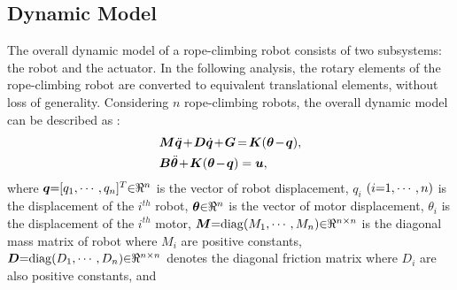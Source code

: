 \documentclass[letterpaper, 10 pt, conference]{ieeeconf}
\begin{document}
\subsection{Dynamic Model}
The overall dynamic model of a rope-climbing robot consists of two subsystems: the robot and the actuator.
In the following analysis, the rotary elements of the rope-climbing robot are converted to equivalent translational elements,
without loss of generality. Considering $n$ rope-climbing robots,
the overall dynamic model can be
described as \cite{ram15_petit}:
\begin{eqnarray}
&\bm M\ddot{{\bm q}}\hspace{-0.05cm}+\hspace{-0.05cm}\bm
D \dot{\bm q}\hspace{-0.05cm}+\hspace{-0.05cm}\bm
G\hspace{-0.05cm}=\hspace{-0.05cm}\bm K(\bm
\theta\hspace{-0.05cm}-\hspace{-0.05cm}\bm
q),\label{grobotDyn}\\
&\bm B\ddot{\bm \theta}\hspace{-0.05cm}+\hspace{-0.05cm}\bm K(\bm
\theta\hspace{-0.05cm}-\hspace{-0.05cm}\bm q)=\bm
u,\label{gactuatorDyn}
\end{eqnarray}
where $\bm q\hspace{-0.1cm}=\hspace{-0.1cm}[q_1, \cdots, q_n]^T\hspace{-0.1cm}\in\hspace{-0.1cm}\Re^n$ is the vector of
robot displacement, $q_i$ $(i\hspace{-0.1cm}=\hspace{-0.1cm}1, \cdots, n)$ is the displacement of the $i^{th}$ robot, $\bm
\theta\hspace{-0.1cm}\in\hspace{-0.1cm}\Re^n$ is the vector of motor displacement, $\theta_i$ is the displacement of the $i^{th}$ motor, $\bm M\hspace{-0.1cm}=\hspace{-0.1cm}{\rm diag}(M_1, \cdots, M_n)\hspace{-0.1cm}\in\hspace{-0.1cm}\Re^{n\times n}$ is the diagonal mass matrix of robot where $M_i$ are positive constants, $\bm D\hspace{-0.1cm}=\hspace{-0.1cm}{\rm diag}(D_1, \cdots, D_n)\hspace{-0.1cm}\in\hspace{-0.1cm}\Re^{n\times n}$ denotes the diagonal friction matrix where $D_i$ are also positive constants, and
\end{document}
